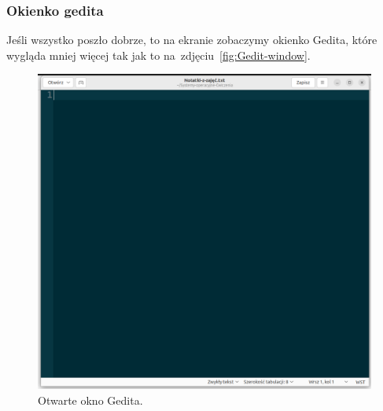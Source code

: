 \documentclass[10pt,t]{beamer}
\begin{document}
\begin{frame}
  \frametitle{Okienko gedita}


  Jeśli wszystko poszło dobrze, to na ekranie zobaczymy okienko Gedita,
  które wygląda mniej więcej tak jak to na~zdjęciu~\eqref{fig:Gedit-window}.





  \begin{figure}

    \centering

    \includegraphics[scale=0.145]
    {./Presentations-pictures/Miscancellous-pictures/gedit-window.png}

    \caption{Otwarte okno Gedita.}


    \label{fig:Gedit-window}

  \end{figure}

\end{frame}
\end{document}
